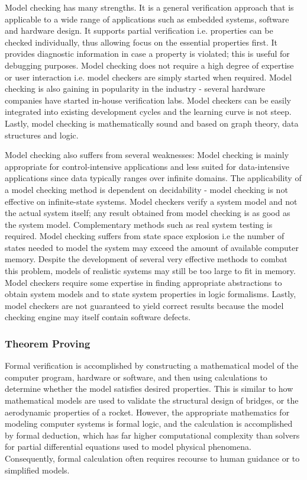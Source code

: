 Model checking has many strengths. It is a general verification approach that is
applicable to a wide range of applications such as embedded systems, software
and hardware design. It supports partial verification i.e. properties can be
checked individually, thus allowing focus on the essential properties first. It
provides diagnostic information in case a property is violated; this is useful
for debugging purposes. Model checking does not require a high degree of
expertise or user interaction i.e. model checkers are simply started when
required. Model checking is also gaining in popularity in the industry - several
hardware companies have started in-house verification labs. Model checkers can
be easily integrated into existing development cycles and the learning curve is
not steep. Lastly, model checking is mathematically sound and based on graph
theory, data structures and logic.

Model checking also suffers from several weaknesses: Model checking is mainly
appropriate for control-intensive applications and less suited for
data-intensive applications since data typically ranges over infinite domains.
The applicability of a model checking method is dependent on decidability -
model checking is not effective on infinite-state systems. Model checkers verify
a system model and not the actual system itself; any result obtained from model
checking is as good as the system model. Complementary methods such as real
system testing is required. Model checking suffers from state space explosion
i.e the number of states needed to model the system may exceed the amount of
available computer memory. Despite the development of several very effective
methods to combat this problem, models of realistic systems may still be too
large to fit in memory. Model checkers require some expertise in finding
appropriate abstractions to obtain system models and to state system properties
in logic formalisms. Lastly, model checkers are not guaranteed to yield correct
results because the model checking engine may itself contain software defects.

\subsubsection{Theorem Proving}

Formal verification is accomplished by constructing a mathematical model of the
computer program, hardware or software, and then using calculations to determine
whether the model satisfies desired properties. This is similar to how
mathematical models are used to validate the structural design of bridges, or
the aerodynamic properties of a rocket. However, the appropriate mathematics for
modeling computer systems is formal logic, and the calculation is accomplished
by formal deduction, which has far higher computational complexity than solvers
for partial differential equations used to model physical phenomena.
Consequently, formal calculation often requires recourse to human guidance or to
simplified models.


